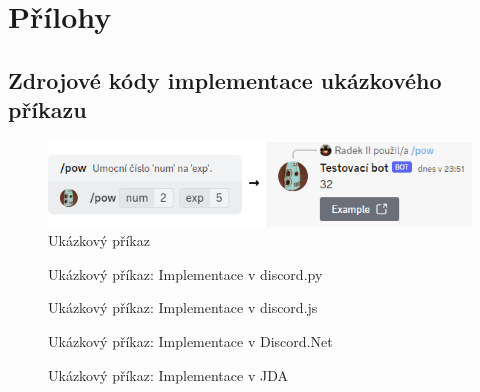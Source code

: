 \documentclass[FM]{tulthesis}
\begin{document}
	\appendix
	\chapter{Přílohy}
	
	\section{Zdrojové kódy implementace ukázkového příkazu}
	
	\begin{figure}[ht]
		\centering
		\includegraphics[width=\textwidth]{img/ExampleCommand}
		\caption{Ukázkový příkaz}
		\label{_tag_img_pow}
	\end{figure}
	
	\begin{figure}[ht]
		
		\caption{Ukázkový příkaz: Implementace v discord.py}
	\end{figure}
	
	\begin{figure}[ht]
		
		\caption{Ukázkový příkaz: Implementace v discord.js}
	\end{figure}
	
	\begin{figure}[ht]
		
		\caption{Ukázkový příkaz: Implementace v Discord.Net}
	\end{figure}
	
	\begin{figure}[ht]
		
		\caption{Ukázkový příkaz: Implementace v JDA}
	\end{figure}
	
\end{document}
